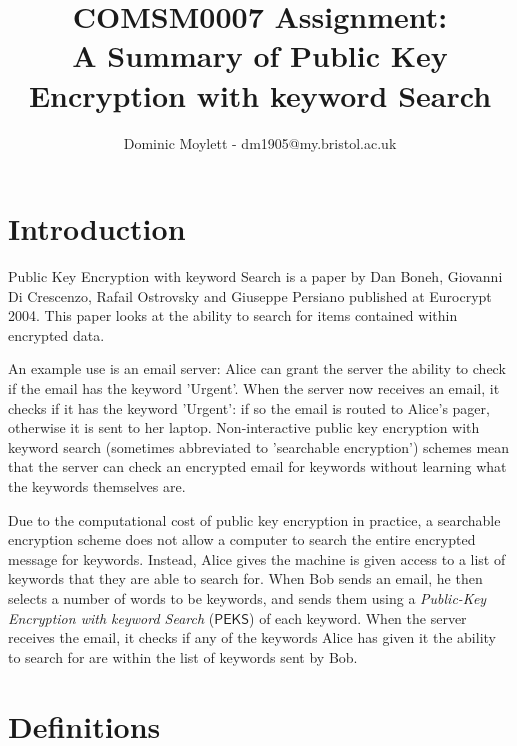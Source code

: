 \documentclass[a4paper,11pt]{article}
\title{COMSM0007 Assignment:\\A Summary of Public Key Encryption with keyword Search}
\author{Dominic Moylett - dm1905@my.bristol.ac.uk}
\begin{document}
    \maketitle

    \section{Introduction}

    Public Key Encryption with keyword Search is a paper by Dan Boneh, Giovanni Di Crescenzo, Rafail Ostrovsky and Giuseppe Persiano published at Eurocrypt 2004. This paper looks at the ability to search for items contained within encrypted data.

    An example use is an email server: Alice can grant the server the ability to check if the email has the keyword 'Urgent'. When the server now receives an email, it checks if it has the keyword 'Urgent': if so the email is routed to Alice's pager, otherwise it is sent to her laptop. Non-interactive public key encryption with keyword search (sometimes abbreviated to 'searchable encryption') schemes mean that the server can check an encrypted email for keywords without learning what the keywords themselves are.

    Due to the computational cost of public key encryption in practice, a searchable encryption scheme does not allow a computer to search the entire encrypted message for keywords. Instead, Alice gives the machine is given access to a list of keywords that they are able to search for. When Bob sends an email, he then selects a number of words to be keywords, and sends them using a \textit{Public-Key Encryption with keyword Search} ($\mathsf{PEKS}$) of each keyword. When the server receives the email, it checks if any of the keywords Alice has given it the ability to search for are within the list of keywords sent by Bob.

    \section{Definitions}
\end{document}

